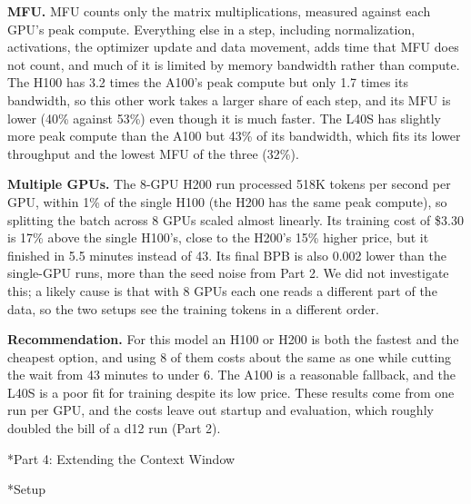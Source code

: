 \documentclass[11pt]{article}
\makeatletter
\renewcommand\section{\@startsection{section}{1}{\z@}{1.2em}{0.5em}{\large\bfseries}}
\renewcommand\subsection{\@startsection{subsection}{2}{\z@}{0.6em}{0.2em}{\normalsize\bfseries}}
\makeatother
\begin{document}
\textbf{MFU.} MFU counts only the matrix multiplications, measured against each GPU's peak compute. Everything else in a step, including normalization, activations, the optimizer update and data movement, adds time that MFU does not count, and much of it is limited by memory bandwidth rather than compute. The H100 has 3.2 times the A100's peak compute but only 1.7 times its bandwidth, so this other work takes a larger share of each step, and its MFU is lower (40\% against 53\%) even though it is much faster. The L40S has slightly more peak compute than the A100 but 43\% of its bandwidth, which fits its lower throughput and the lowest MFU of the three (32\%).

\textbf{Multiple GPUs.} The 8-GPU H200 run processed 518K tokens per second per GPU, within 1\% of the single H100 (the H200 has the same peak compute), so splitting the batch across 8 GPUs scaled almost linearly. Its training cost of \$3.30 is 17\% above the single H100's, close to the H200's 15\% higher price, but it finished in 5.5 minutes instead of 43. Its final BPB is also 0.002 lower than the single-GPU runs, more than the seed noise from Part 2. We did not investigate this; a likely cause is that with 8 GPUs each one reads a different part of the data, so the two setups see the training tokens in a different order.

\textbf{Recommendation.} For this model an H100 or H200 is both the fastest and the cheapest option, and using 8 of them costs about the same as one while cutting the wait from 43 minutes to under 6. The A100 is a reasonable fallback, and the L40S is a poor fit for training despite its low price. These results come from one run per GPU, and the costs leave out startup and evaluation, which roughly doubled the bill of a d12 run (Part 2).

\newpage

\section*{Part 4: Extending the Context Window}

\subsection*{Setup}
\end{document}

